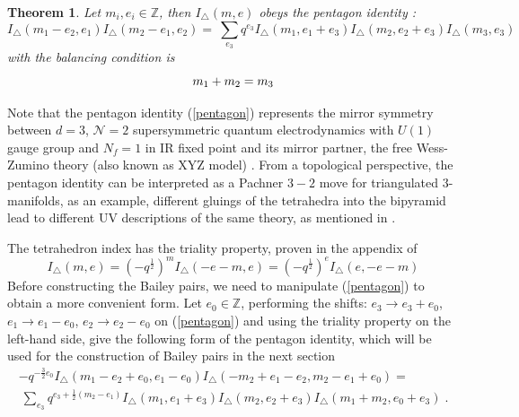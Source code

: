 \documentclass[11pt,a4paper]{article}
\newtheorem{theorem}{Theorem}[section]
\begin{document}
\begin{theorem}
Let $m_i, e_i \in \mathbb{Z}$, then ${I_{\triangle}}(m,e)$  obeys the pentagon identity  \cite{Dimofte:2011py, Garoufalidis2012The3I}:
    \begin{equation}
         \label{pentagon}
{I_{\triangle}}(m_1-e_2,e_1){I_{\triangle}}(m_2-e_1,e_2)
 = \ \sum_{e_3} q^{e_3} {I_{\triangle}}(m_1,e_1+e_3){I_{\triangle}}(m_2,e_2+e_3){I_{\triangle}}(m_3,e_3)
\end{equation}
with the balancing condition is
\begin{equation}\label{condition}
 \newline
 m_1 + m_2 = m_3
\end{equation}

\end{theorem}
Note that the pentagon identity (\ref{pentagon}) represents the mirror symmetry between $d=3$, ${\mathcal N}=2$ supersymmetric quantum electrodynamics with $U(1)$ gauge group and $N_f = 1$ in IR fixed point and its mirror partner, the free Wess-Zumino theory (also known as XYZ model) \cite{Dimofte:2011py}. From a topological perspective, the pentagon identity can be interpreted as a Pachner $3-2$ move for triangulated $3$-manifolds, as an example, different gluings of the tetrahedra into the bipyramid lead to different UV descriptions of the same theory,  as mentioned in \cite{Dimofte:2011py, Kashaev:2012cz}.

The tetrahedron index has the triality property, proven in the appendix of \cite{Dimofte:2011py}
\begin{equation}\label{triality}
    {I_{\triangle}}(m,e) = (-q^{\frac{1}{2}})^m {I_{\triangle}}(-e-m,e) = (-q^{\frac{1}{2}})^e {I_{\triangle}}(e,-e-m)
\end{equation}
Before constructing the Bailey pairs, we need to manipulate (\ref{pentagon}) to obtain a more convenient form. Let $e_0 \in \mathbb{Z}$, performing the shifts: $e_3 \xrightarrow{} e_3 + e_0$,  $e_1 \xrightarrow{} e_1 - e_0$, $e_2 \xrightarrow{} e_2 - e_0$ on (\ref{pentagon}) and using the triality property on the left-hand side, give the following form of the pentagon identity, which will be used for the construction of Bailey pairs in the next section
\begin{multline}\label{pentagonfinal}
    -q^{-\frac{3}{2}e_0}{I_{\triangle}}(m_1 - e_2 + e_0,e_1 - e_0){I_{\triangle}}(-m_2 + e_1 - e_2, m_2 - e_1 + e_0)= \\ 
    \ \sum_{e_3} q^{e_3 + \frac{1}{2}(m_2 - e_1)} {I_{\triangle}}(m_1, e_1 + e_3) {I_{\triangle}}(m_2, e_2 + e_3) {I_{\triangle}}(m_1 + m_2 ,e_0 + e_3)  \;. \end{multline}
\end{document}
